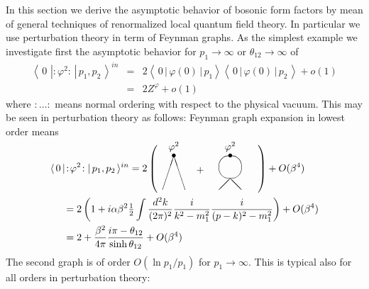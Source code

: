 \documentclass[a4paper,a4paper]{article}
\begin{document}
In this section we derive the asymptotic behavior of bosonic form factors by
mean of general techniques of renormalized local quantum field theory. In
particular we use perturbation theory in term of Feynman graphs. As the
simplest example we investigate first the asymptotic behavior for $%
p_{1}\rightarrow \infty $ or $\theta _{12}\rightarrow \infty $ of 
\begin{eqnarray*}
\left\langle \,0\,\,|\!:\!\varphi ^{2}\!:\!\,|\,p_{1},p_{2}\,\right\rangle
^{in} &=&2\left\langle \,0\,|\,\varphi (0)\,|\,p_{1}\right\rangle
\left\langle \,0\,\left| \,\varphi (0)\,\right| \,p_{2}\,\right\rangle +o(1)
\\
&=&2Z^{\varphi }+o(1)
\end{eqnarray*}
where $:\dots :$ means normal ordering with respect to the physical vacuum.
This may be seen in perturbation theory as follows: Feynman graph expansion
in lowest order means 
\begin{align*}
\langle \,0\,|\!& :\!\varphi ^{2}\!:\!\,|\,p_{1},p_{2}\,\rangle
^{in}=2\left( 
\begin{array}{c}
\unitlength4mm\begin{picture}(8,4) \put(1,3){\makebox(0,0){$\bullet$}}
\put(6,3){\makebox(0,0){$\bullet$}} \put(1,3.8){\makebox(0,0){$\varphi^2$}}
\put(6,3.8){\makebox(0,0){$\varphi^2$}} \put(0,0){\line(1,3){1}}
\put(2,0){\line(-1,3){1}} \put(3,1.5){$+$} \put(5,0){\line(1,1){1}}
\put(7,0){\line(-1,1){1}} \put(6,2){\oval(2,2)} \end{picture}
\end{array}
\right) +O(\beta ^{4}) \\
& =2\left( 1+i\alpha \beta ^{2}\tfrac{1}{2}\int \frac{d^{2}k}{(2\pi )^{2}}%
\frac{i}{k^{2}-m_{1}^{2}}\frac{i}{(p-k)^{2}-m_{1}^{2}}\right) +O(\beta ^{4})
\\
& =2+\frac{\beta ^{2}}{4\pi }\frac{i\pi -\theta _{12}}{\sinh \theta _{12}}%
+O(\beta ^{4})
\end{align*}
The second graph is of order $O(\ln p_{1}/p_{1})$ for $p_{1}\to \infty $.
This is typical also for all orders in perturbation theory:
\end{document}
